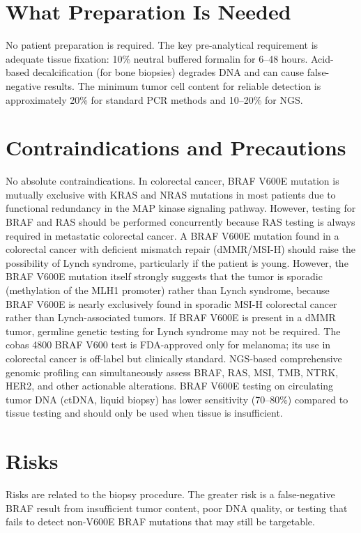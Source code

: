 \section*{What Preparation Is Needed}
No patient preparation is required. The key pre-analytical requirement is adequate tissue fixation: 10\% neutral buffered formalin for 6--48 hours. Acid-based decalcification (for bone biopsies) degrades DNA and can cause false-negative results. The minimum tumor cell content for reliable detection is approximately 20\% for standard PCR methods and 10--20\% for NGS.

\section*{Contraindications and Precautions}
No absolute contraindications. In colorectal cancer, BRAF V600E mutation is mutually exclusive with KRAS and NRAS mutations in most patients due to functional redundancy in the MAP kinase signaling pathway. However, testing for BRAF and RAS should be performed concurrently because RAS testing is always required in metastatic colorectal cancer. A BRAF V600E mutation found in a colorectal cancer with deficient mismatch repair (dMMR/MSI-H) should raise the possibility of Lynch syndrome, particularly if the patient is young. However, the BRAF V600E mutation itself strongly suggests that the tumor is sporadic (methylation of the MLH1 promoter) rather than Lynch syndrome, because BRAF V600E is nearly exclusively found in sporadic MSI-H colorectal cancer rather than Lynch-associated tumors. If BRAF V600E is present in a dMMR tumor, germline genetic testing for Lynch syndrome may not be required. The cobas 4800 BRAF V600 test is FDA-approved only for melanoma; its use in colorectal cancer is off-label but clinically standard. NGS-based comprehensive genomic profiling can simultaneously assess BRAF, RAS, MSI, TMB, NTRK, HER2, and other actionable alterations. BRAF V600E testing on circulating tumor DNA (ctDNA, liquid biopsy) has lower sensitivity (70--80\%) compared to tissue testing and should only be used when tissue is insufficient.

\section*{Risks}
Risks are related to the biopsy procedure. The greater risk is a false-negative BRAF result from insufficient tumor content, poor DNA quality, or testing that fails to detect non-V600E BRAF mutations that may still be targetable.

